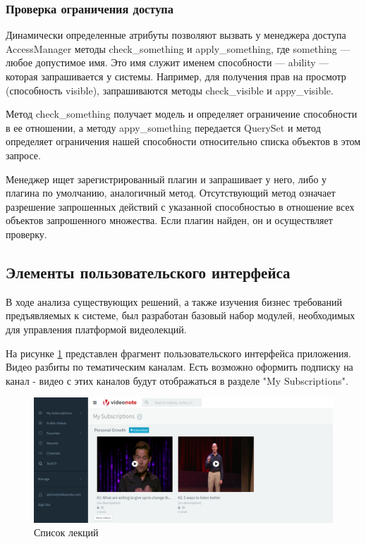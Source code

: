 \FloatBarrier

\subsubsection{Проверка ограничения доступа}

Динамически определенные атрибуты позволяют вызвать у менеджера доступа AccessManager методы check\_something и apply\_something,
где something — любое допустимое имя. Это имя служит именем способности — ability — которая запрашивается у системы.
Например, для получения прав на просмотр (способность visible), запрашиваются методы check\_visible и appy\_visible.

Метод check\_something получает модель и определяет ограничение способности в ее отношении, а методу appy\_something
передается QuerySet и метод определяет ограничения нашей способности относительно списка объектов в этом запросе.

Менеджер ищет зарегистрированный плагин и запрашивает у него, либо у плагина по умолчанию, аналогичный метод.
Отсутствующий метод означает разрешение запрошенных действий с указанной способностью в отношение всех объектов
запрошенного множества. Если плагин найден, он и осуществляет проверку.
















\subsection{Элементы пользовательского интерфейса}

В ходе анализа существующих решений, а также изучения бизнес требований предъявляемых к системе,
был разработан базовый набор модулей, необходимых для управления платформой видеолекций.

На рисунке \ref{user-interface} представлен фрагмент пользовательского интерфейса приложения.
Видео разбиты по тематическим каналам. Есть возможно оформить подписку на канал - видео с этих
каналов будут отображаться в разделе "My Subscriptions".

\begin{figure}
  \centering
  \includegraphics[width=1\textwidth]{images/user-interface.jpg}
  \caption{Список лекций\label{user-interface}}
\end{figure}

